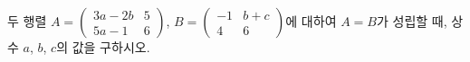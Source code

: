 두 행렬 $A=\begin{pmatrix} 3a-2b & 5 \\ 5a-1 & 6 \end{pmatrix}$, $B=\begin{pmatrix} -1 & b+c \\ 4 & 6 \end{pmatrix}$에 대하여 $A=B$가 성립할 때, 상수 $a$, $b$, $c$의 값을 구하시오.
